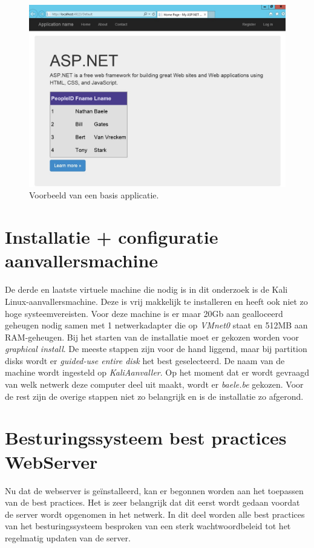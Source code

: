 \documentclass[pdftex,a4paper,12pt]{report}
\begin{document}
\begin{figure}[H]
\begin{center}
\includegraphics[scale=0.45]{img/ASPapp}
\end{center}
\caption{Voorbeeld van een basis applicatie.}
\label{img:ASPapp}
\end{figure}

\section{Installatie + configuratie aanvallersmachine}
De derde en laatste virtuele machine die nodig is in dit onderzoek is de Kali Linux-aanvallersmachine. Deze is vrij makkelijk te installeren en heeft ook niet zo hoge systeemvereisten. Voor deze machine is er maar 20Gb aan gealloceerd geheugen nodig samen met 1 netwerkadapter die op \textit{VMnet0} staat en 512MB aan RAM-geheugen. Bij het starten van de installatie moet er gekozen worden voor \textit{graphical install}. De meeste stappen zijn voor de hand liggend, maar bij partition disks wordt er \textit{guided-use entire disk} het best geselecteerd. De naam van de machine wordt ingesteld op \textit{KaliAanvaller}. Op het moment dat er wordt gevraagd van welk netwerk deze computer deel uit maakt, wordt er \textit{baele.be} gekozen. Voor de rest zijn de overige stappen niet zo belangrijk en is de installatie zo afgerond.

\section{Besturingssysteem best practices WebServer}
Nu dat de webserver is geïnstalleerd, kan er begonnen worden aan het toepassen van de best practices. Het is zeer belangrijk dat dit eerst wordt gedaan voordat de server wordt opgenomen in het netwerk. In dit deel worden alle best practices van het besturingssysteem besproken van een sterk wachtwoordbeleid tot het regelmatig updaten van de server.
\end{document}
